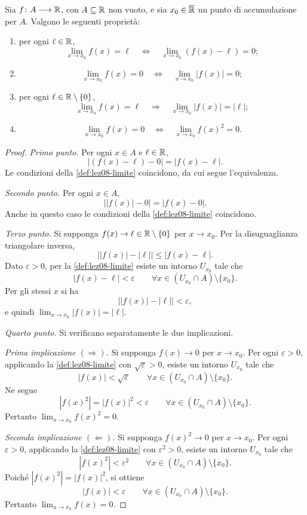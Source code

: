 \begin{proposition}
\label{prop:lez13-proprieta-limiti}
Sia \(f\colon A\longrightarrow\mathbb{R}\), con \(A\subseteq\mathbb{R}\)
non vuoto, e sia \(x_0\in\overline{\mathbb{R}}\) un punto di
accumulazione per \(A\). Valgono le seguenti proprietà:
\begin{enumerate}
  \item per ogni \(\ell\in\mathbb{R}\),
  \[
    \lim_{x\to x_0}f(x)=\ell
    \quad\Longleftrightarrow\quad
    \lim_{x\to x_0}(f(x)-\ell)=0;
  \]
  \item
  \[
    \lim_{x\to x_0}f(x)=0
    \quad\Longleftrightarrow\quad
    \lim_{x\to x_0}|f(x)|=0;
  \]
  \item per ogni \(\ell\in\mathbb{R}\setminus\{0\}\),
  \[
    \lim_{x\to x_0}f(x)=\ell
    \quad\Longrightarrow\quad
    \lim_{x\to x_0}|f(x)|=|\ell|;
  \]
  \item
  \[
    \lim_{x\to x_0}f(x)=0
    \quad\Longleftrightarrow\quad
    \lim_{x\to x_0}f(x)^2=0.
  \]
\end{enumerate}
\end{proposition}

\begin{proof}
\emph{Primo punto.}
Per ogni \(x\in A\) e \(\ell\in\mathbb{R}\),
\[
  |(f(x)-\ell)-0|=|f(x)-\ell|.
\]
Le condizioni della \cref{def:lez08-limite}
coincidono, da cui segue l'equivalenza.

\emph{Secondo punto.}
Per ogni \(x\in A\),
\[
  \bigl||f(x)|-0\bigr|=|f(x)-0|.
\]
Anche in questo caso le condizioni della
\cref{def:lez08-limite} coincidono.

\emph{Terzo punto.}
Si supponga \(f(x)\to\ell\in\mathbb{R}\setminus\{0\}\)
per \(x\to x_0\). Per la disuguaglianza triangolare inversa,
\[
  \bigl||f(x)|-|\ell|\bigr|\le|f(x)-\ell|.
\]
Dato \(\varepsilon>0\), per la \cref{def:lez08-limite}
esiste un intorno \(U_{x_0}\) tale che
\[
  |f(x)-\ell|<\varepsilon
  \qquad\forall x\in(U_{x_0}\cap A)\setminus\{x_0\}.
\]
Per gli stessi \(x\) si ha
\[
  \bigl||f(x)|-|\ell|\bigr|<\varepsilon,
\]
e quindi \(\lim_{x\to x_0}|f(x)|=|\ell|\).

\emph{Quarto punto.}
Si verificano separatamente le due implicazioni.

\emph{Prima implicazione \((\Rightarrow)\).}
Si supponga \(f(x)\to0\) per \(x\to x_0\).
Per ogni \(\varepsilon>0\), applicando la
\cref{def:lez08-limite} con \(\sqrt{\varepsilon}>0\),
esiste un intorno \(U_{x_0}\) tale che
\[
  |f(x)|<\sqrt{\varepsilon}
  \qquad\forall x\in(U_{x_0}\cap A)\setminus\{x_0\}.
\]
Ne segue
\[
  |f(x)^2|=|f(x)|^2<\varepsilon
  \qquad\forall x\in(U_{x_0}\cap A)\setminus\{x_0\}.
\]
Pertanto \(\lim_{x\to x_0}f(x)^2=0\).

\emph{Seconda implicazione \((\Leftarrow)\).}
Si supponga \(f(x)^2\to0\) per \(x\to x_0\).
Per ogni \(\varepsilon>0\), applicando la
\cref{def:lez08-limite} con \(\varepsilon^2>0\),
esiste un intorno \(U_{x_0}\) tale che
\[
  |f(x)^2|<\varepsilon^2
  \qquad\forall x\in(U_{x_0}\cap A)\setminus\{x_0\}.
\]
Poiché \(|f(x)^2|=|f(x)|^2\), si ottiene
\[
  |f(x)|<\varepsilon
  \qquad\forall x\in(U_{x_0}\cap A)\setminus\{x_0\}.
\]
Pertanto \(\lim_{x\to x_0}f(x)=0\).
\end{proof}
